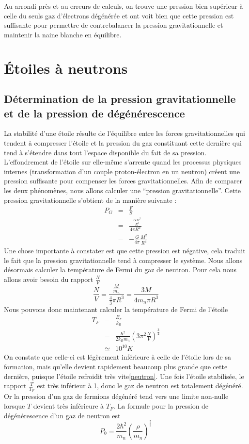 \documentclass[11pt]{book} %
\begin{document}
Au arrondi près et au erreurs de calculs, on trouve une pression bien supérieur à celle du seuls gaz d’électrons dégénérée et ont voit bien que cette pression est suffisante pour permettre de contrebalancer la pression gravitationnelle et maintenir la naine blanche en équilibre.


\section{Étoiles à neutrons}
\subsection{Détermination de la pression gravitationnelle et de la pression de dégénérescence}
La stabilité d'une étoile résulte de l'équilibre entre les forces gravitationnelles qui tendent à compresser l'étoile et la pression du gaz constituant cette dernière qui tend à s'étendre dans tout l'espace disponible du fait de sa pression. L'effondrement de l'étoile sur elle-même s'arrente quand les processus physiques internes (transformation d'un couple proton-électron en un neutron) créent une pression suffisante pour compenser les forces gravitationnelles. Afin de comparer les deux phénomènes, nous allons calculer une ``pression gravitationnelle''. Cette pression gravitationnelle s'obtient de la manière suivante : 
\begin{eqnarray*}
    P_G&=&\frac{F}{S}\\
    &=&\frac{-\frac{GM^2}{R^2}}{4\pi R^2}\\
    &=&-\frac{G}{4\pi}\frac{M^2}{R^4}
\end{eqnarray*}
Une chose importante à constater est que cette pression est négative, cela traduit le fait que la pression gravitationnelle tend à compresser le système.\n
Nous allons désormais calculer la température de Fermi du gaz de neutron. Pour cela nous allons avoir besoin du rapport \(\frac{N}{V}\)
\[\frac{N}{V}=\frac{\frac{M}{m_n}}{\frac{4}{3}\pi R^3}=\frac{3M}{4m_n\pi R^3}\]
Nous pouvons donc maintenant calculer la température de Fermi de l'étoile
\begin{eqnarray*}
    T_F&=&\frac{E_F}{k_B}\\
    &=&\frac{\hbar^2}{2k_Bm_n}\left(3\pi^2\frac{N}{V}\right)^{\frac{3}{2}}\\
    &\simeq&10^{10}K
\end{eqnarray*}
On constate que celle-ci est légèrement inférieure à celle de l'étoile lors de sa formation, mais qu'elle devient rapidement beaucoup plus grande que cette dernière, puisque l'étoile refroidit très vite\ref{neutron}. Une fois l'étoile stabilisée, le rapport \(\frac{T}{T_F}\) est très inférieur à 1, donc le gaz de neutron est totalement dégénéré. Or la pression d'un gaz de fermions dégénéré tend vers une limite non-nulle lorsque \(T\) devient très inférieure à \(T_F\). 
\n
La formule pour la pression de dégénérescence d'un gaz de neutron est \[P_0=\frac{2\hbar^2}{m_n}\left(\frac{\rho}{m_n}\right)^{\frac{5}{3}}\]
\end{document}
